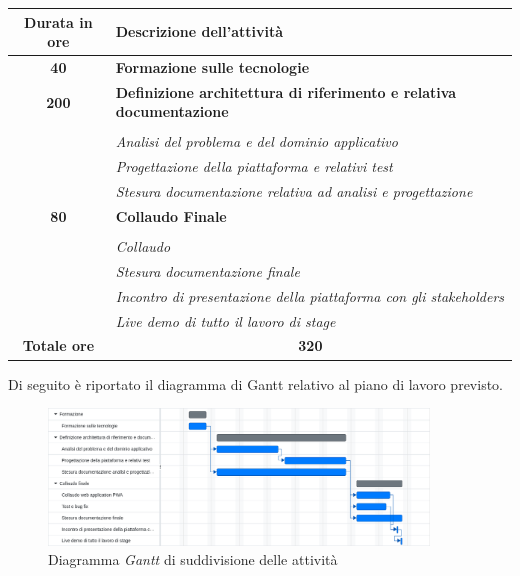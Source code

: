    \begin{tabularx}{\textwidth}{|c|X|}
        \hline
        \textbf{Durata in ore} & \textbf{Descrizione dell'attività} \\ \hline
        
        \textbf{40} & \textbf{Formazione sulle tecnologie} \\	 
        \hline
        
        \textbf{200} & \textbf{Definizione architettura di riferimento e relativa documentazione} \\ \hdashline 
        \multirow{3}{0cm}\\ 
         & 
        \textit{Analisi del problema e del dominio applicativo} \\
         & 
        \textit{Progettazione della piattaforma e relativi test} \\
         & 
        \textit{Stesura documentazione relativa ad analisi e progettazione} \\
        \hline
        
        \textbf{80} & \textbf{Collaudo Finale}  \\ \hdashline 
        \multirow{4}{0cm}\\ 
         & 
        \textit{Collaudo} \\
         & 
        \textit{Stesura documentazione finale} \\
         & 
        \textit{Incontro di presentazione della piattaforma con gli stakeholders} \\
         & 
        \textit{Live demo di tutto il lavoro di stage} \\
        \hline
        
        \textbf{Totale ore} & \multicolumn{1}{|c|}{\textbf{320}} \\ \hline
        
    \end{tabularx}

    Di seguito è riportato il diagramma di Gantt relativo al piano di lavoro previsto.
    \begin{figure}[H]
        \centering
        \includegraphics[width=0.9\textwidth]{images/gantt.png}
        \caption[Diagramma \textit{Gantt} di suddivisione delle attività]{Diagramma \textit{Gantt} di suddivisione delle attività}
    \end{figure}


